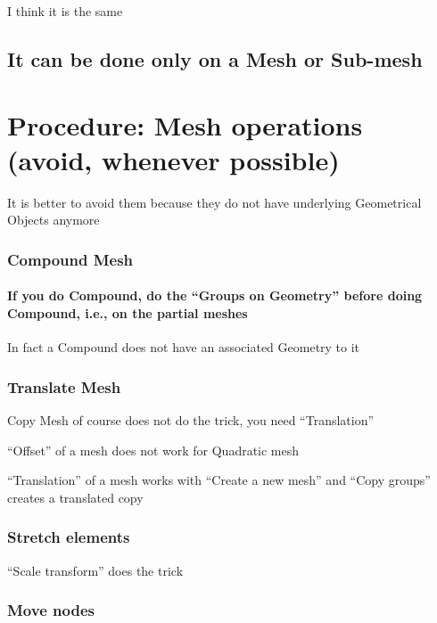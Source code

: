 \documentclass[10pt]{book}
\begin{document}
  I think it is the same
  
  \section{It can be done only on a Mesh or Sub-mesh}
  
  
  
  
  \chapter{Procedure: Mesh operations (avoid, whenever possible)}
  
   It is better to avoid them because they do not have underlying Geometrical Objects anymore
   

   
\subsection{Compound Mesh}
   
   
  \subsubsection{If you do Compound, do the ``Groups on Geometry'' before doing Compound, i.e., on the partial meshes}         
 
 
  In fact a Compound does not have an associated Geometry to it
        

   
\subsection{Translate Mesh}

 
 Copy Mesh of course does not do the trick, you need ``Translation''
 
 ``Offset'' of a mesh does not work for Quadratic mesh
 
 ``Translation'' of a mesh works with ``Create a new mesh'' and ``Copy groups'' creates a translated copy


\subsection{Stretch elements}

  ``Scale transform'' does the trick

   
 \subsection{Move nodes}
\end{document}
